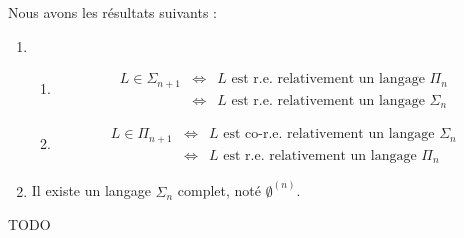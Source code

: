 \begin{theorem} [de post]
	Nous avons les résultats suivants :
	\begin{enumerate}
		\item
		      \begin{enumerate}
			      \item
			            \begin{eqnarray*}
				            L \in \Sigma_{n+1} &\iff& L \text{ est r.e. relativement  un langage }  \Pi_n  \\
				            &\iff& L \text{ est r.e. relativement  un langage }  \Sigma_{n}
			            \end{eqnarray*}

			      \item
			            \begin{eqnarray*}
				            L \in \Pi_{n+1} &\iff& L \text{ est co-r.e. relativement  un langage }  \Sigma_n  \\
				            &\iff& L \text{ est r.e. relativement  un langage }  \Pi_n
			            \end{eqnarray*}
		      \end{enumerate}

		\item Il existe un langage $\Sigma_n$ complet, noté $\emptyset^{(n)}$.
	\end{enumerate}
\end{theorem}

TODO
